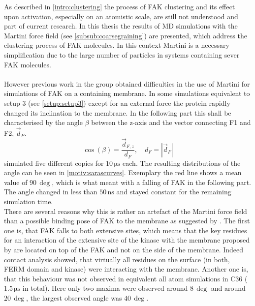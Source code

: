 \label{motivation}
As described in \autoref{intro:clustering} the process of FAK clustering and its effect upon activation, especially on an atomistic scale, are still not understood and part of current research. In this thesis the results of MD simulations with the Martini force field (see \autoref{subsub:coarsegraining}) are presented, which address the clustering process of FAK molecules. In this context Martini is a necessary simplification due to the large number of particles in systems containing sever FAK molecules.\\
\\
However previous work in the group \autocite{sara} obtained difficulties in the use of Martini for simulations of FAK on a \pip{} containing membrane. In some simulations equivalent to setup 3 (see \autoref{setup:setup3}) except for an external force the protein rapidly changed its inclination to the membrane. In the following part this shall be characterised by the angle $\beta$ between the z-axis and the vector connecting F1 and F2, $\vec{d}_F$.
\begin{equation}
\cos\left(\beta\right) = \frac{\vec{d}_{F, z}}{d_F},\quad d_F = \left|\vec{d}_F\right|
\end{equation}
\textcite{sara} simulated five different copies for $10\,\si{\micro\second}$ each. The resulting distributions of the angle can be seen in \autoref{motiv:sarascurves}. Exemplary the red line shows a mean value of $90\,\si{\deg}$, which is what meant with a falling of FAK in the following part. The angle changed in less than $50\,\si{\nano\second}$ and stayed constant for the remaining simulation time.\\
There are several reasons why this is rather an artefact of the Martini force field than a possible binding pose of FAK to the membrane as suggested by \textcite{pap002}. The first one is, that FAK falls to both extensive sites, which means that the key residues for an interaction of the extensive site of the kinase with the membrane proposed by \textcite{pap002} are located on top of the FAK and not on the side of the membrane. Indeed contact analysis showed, that virtually all residues on the surface (in both, FERM domain and kinase) were interacting with the membrane. Another one is, that this behaviour was not observed in equivalent all atom simulations in C36 ($1.5\,\si{\micro\second}$ in total). Here only two maxima were observed around $8\,\si{\deg}$ and around $20\,\si{\deg}$, the largest observed angle was $40\,\si{\deg}$.\\
\\

